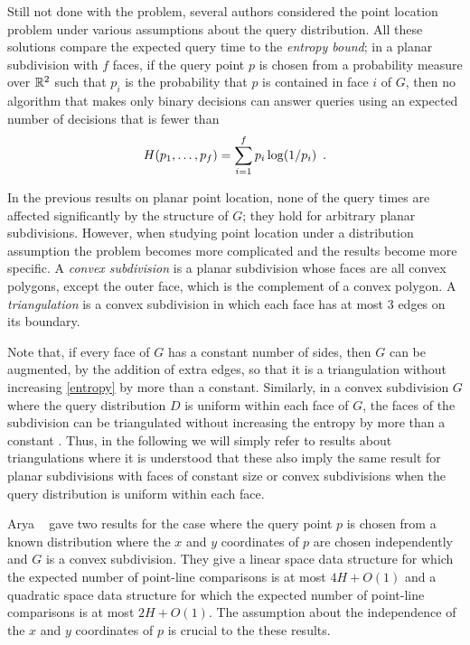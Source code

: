 \documentclass[lotsofwhite]{patmorin}
\begin{document}
Still not done with the problem, several authors considered the point
location problem under various assumptions about the query
distribution.  All these solutions compare the expected query time to
the \emph{entropy bound};  in a planar subdivision with $f$ faces, if the query
point $p$ is chosen from a probability measure over $\mathbb{R}^2$ such that
$p_i$ is the probability that $p$ is contained in face $i$ of $G$,
then no algorithm that makes only binary decisions can answer queries
using an expected number of decisions that is fewer than 
\begin{equation}
    H(p_1,\ldots,p_f) = \sum_{i=1}^f p_i\log(1/p_i) \enspace . 
	\eqlabel{entropy}
	\eqlabel{entropy-face}
\end{equation}

In the previous results on planar point location, none of the query
times are affected significantly by the structure of $G$;  they hold
for arbitrary planar subdivisions.  However, when studying point
location under a distribution assumption the problem becomes more
complicated and the results become more specific.  A \emph{convex
subdivision} is a planar subdivision whose faces are all convex
polygons, except the outer face, which is the complement of a convex
polygon.  A \emph{triangulation} is a convex subdivision in which each
face has at most 3 edges on its boundary.

Note that, if every face of $G$ has a constant number of sides, then
$G$ can be augmented, by the addition of extra edges, so that it is a
triangulation without increasing \eqref{entropy} by more than a
constant.  Similarly, in a convex subdivision $G$ where the query
distribution $D$ is uniform within each face of $G$, the faces of the
subdivision can be triangulated without increasing the entropy by more
than a constant \cite{amm00}. Thus, in the following we will simply
refer to results about triangulations where it is understood that
these also imply the same result for planar subdivisions with faces of
constant size or convex subdivisions when the query distribution is
uniform within each face.

Arya \etal\ \cite{acmr00} gave two results for the case where the
query point $p$ is chosen from a known distribution where the $x$ and
$y$ coordinates of $p$ are chosen independently and $G$ is a convex
subdivision.  They give a linear space data structure for which the
expected number of point-line comparisons is at most $4H+O(1)$ and a
quadratic space data structure for which the expected number of
point-line comparisons is at most $2H+O(1)$.  The assumption about the
independence of the $x$ and $y$ coordinates of $p$ is crucial to the
these results.
\end{document}
